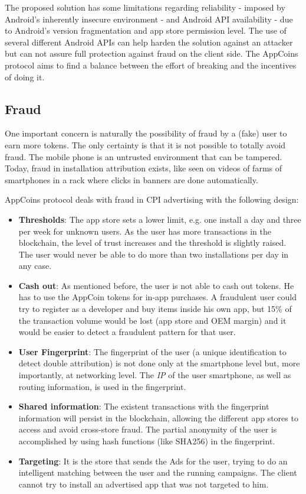 \medskip

The proposed solution has some limitations regarding reliability - imposed by Android's inherently 
insecure environment - and Android API availability - due to Android's version fragmentation and app 
store permission level. The use of several different Android APIs can help harden the solution 
against an attacker but can not assure full protection against fraud on the client side. The AppCoins protocol aims to find a balance between the effort of breaking and the incentives of doing it.

\subsection{Fraud}

One important concern is naturally the possibility of fraud by a (fake) user to earn more tokens. The only certainty is that it is not possible to totally avoid fraud. The mobile phone is an untrusted environment that can be tampered. Today, fraud in installation attribution exists, like seen on videos of farms of smartphones in a rack where clicks in banners are done automatically.

\medskip

AppCoins protocol deals with fraud in CPI advertising with the following design: 

\begin{itemize}
\item {\bf Thresholds}: The app store sets a lower limit, e.g. one install a day and three per week for unknown users. As the user has more transactions in the blockchain, the level of trust increases and the threshold is slightly raised. The user would never be able to do more than two installations per day in any case. 
\item {\bf Cash out}: As mentioned before, the user is not able to cash out tokens. He has to use the AppCoin tokens for in-app purchases. A fraudulent user could try to register as a developer and buy items inside his own app, but 15\% of the transaction volume would be lost (app store and OEM margin) and it would be easier to detect a fraudulent pattern for that user. 
\item {\bf User Fingerprint}: The fingerprint of the user (a unique identification to detect double attribution) is not done only at the smartphone level but, more importantly, at networking level. The  {\em IP} of the user smartphone, as well as routing information, is used in the fingerprint.
\item {\bf Shared information}: The existent transactions with the fingerprint information will persist in the blockchain, allowing the different app stores to access and avoid cross-store fraud. The partial anonymity of the user is accomplished by using hash functions (like SHA256) in the fingerprint. 
\item {\bf Targeting}: It is the store that sends the Ads for the user, trying to do an intelligent matching between the user and the running campaigns. The client cannot try to install an advertised app that was not targeted to him.
\end{itemize}

